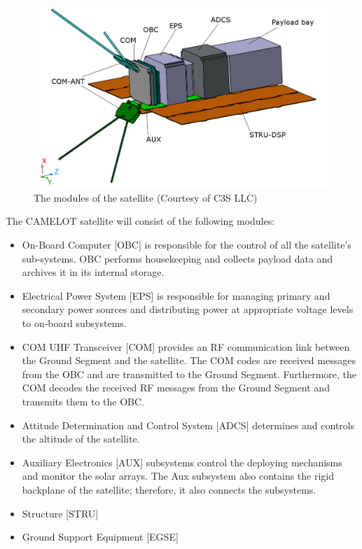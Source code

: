 \documentclass[12pt, a4paper,titlepage]{article}
\numberwithin{equation}{section}
\numberwithin{figure}{section}
\begin{document}
\begin{figure}[H]
\centering
\includegraphics[width=130.0mm]{images/satellite_modules.png}
\caption{The modules of the satellite (Courtesy of C3S LLC) \cite{drawing}}
\end{figure}

The CAMELOT satellite will consist of the following modules:

\begin{itemize}
\item On-Board Computer [OBC] is responsible for the control of all the satellite’s sub-systems. OBC performs housekeeping and collects payload data and archives it in its internal storage.
\item Electrical Power System [EPS] is responsible for managing primary and secondary power sources and distributing power at appropriate voltage levels to on-board subsystems.
\item COM UHF Transceiver [COM] provides an RF communication link between the Ground Segment and the satellite. The COM codes are received messages from the OBC and are transmitted to the Ground Segment. Furthermore, the COM decodes the received RF messages from the Ground Segment and transmits them to the OBC.
\item Attitude Determination and Control System [ADCS] determines and controls the altitude of the satellite.
\item Auxiliary Electronics [AUX] subsystems control the deploying mechanisms and monitor the solar arrays. The Aux subsystem also contains the rigid backplane of the satellite; therefore, it also connects the subsystems.
\item Structure [STRU]
\item Ground Support Equipment [EGSE]
\end{itemize}
\end{document}
